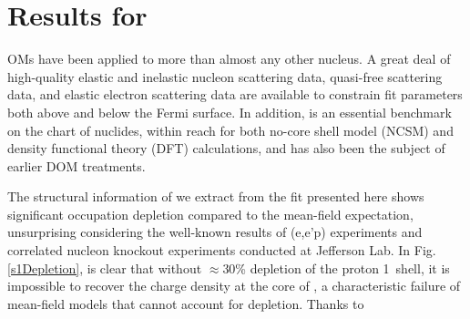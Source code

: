 %
%
%
%
%



\section{Results for \caAughtEight}
OMs have been applied to \caForty more than almost any other nucleus. A great deal of high-quality
elastic and inelastic nucleon scattering data, quasi-free scattering data, and elastic electron
scattering data are available to constrain fit parameters both above and below the Fermi surface. In
addition, \caForty is an essential benchmark on the chart of nuclides, within reach for both no-core
shell model (NCSM) and density functional theory (DFT) calculations, and has also been the subject
of earlier DOM treatments.

The structural information of \caForty we extract from the fit
presented here shows significant occupation depletion compared to the mean-field expectation,
unsurprising considering the well-known results of (e,e'p) experiments and correlated nucleon knockout
experiments conducted at Jefferson Lab. In Fig. \ref{s1Depletion}, is clear that without $\approx$30\%
depletion of the proton 1\sOne\ shell, it is impossible to recover the charge density at the core of
\caForty, a characteristic failure of mean-field models that cannot account for depletion. Thanks to 

